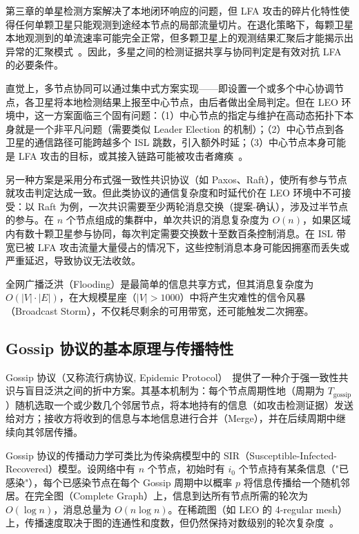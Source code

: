 第三章的单星检测方案解决了本地闭环响应的问题，但 LFA 攻击的碎片化特性使得任何单颗卫星只能观测到途经本节点的局部流量切片。在退化策略下，每颗卫星本地观测到的单流速率可能完全正常，但多颗卫星上的观测结果汇聚后才能揭示出异常的汇聚模式~\cite{crossfire, satshield}。因此，多星之间的检测证据共享与协同判定是有效对抗 LFA 的必要条件。

直觉上，多节点协同可以通过集中式方案实现——即设置一个或多个中心协调节点，各卫星将本地检测结果上报至中心节点，由后者做出全局判定。但在 LEO 环境中，这一方案面临三个固有问题：（1）中心节点的指定与维护在高动态拓扑下本身就是一个非平凡问题（需要类似 Leader Election 的机制）；（2）中心节点到各卫星的通信路径可能跨越多个 ISL 跳数，引入额外时延；（3）中心节点本身可能是 LFA 攻击的目标，或其接入链路可能被攻击者瘫痪~\cite{crossfire}。

另一种方案是采用分布式强一致性共识协议（如 Paxos、Raft），使所有参与节点就攻击判定达成一致。但此类协议的通信复杂度和时延代价在 LEO 环境中不可接受：以 Raft 为例，一次共识需要至少两轮消息交换（提案-确认），涉及过半节点的参与。在 $n$ 个节点组成的集群中，单次共识的消息复杂度为 $O(n)$，如果区域内有数十颗卫星参与协同，每次判定需要交换数十至数百条控制消息。在 ISL 带宽已被 LFA 攻击流量大量侵占的情况下，这些控制消息本身可能因拥塞而丢失或严重延迟，导致协议无法收敛。

全网广播泛洪（Flooding）是最简单的信息共享方式，但其消息复杂度为 $O(|V| \cdot |E|)$，在大规模星座（$|V| > 1000$）中将产生灾难性的信令风暴（Broadcast Storm），不仅耗尽剩余的可用带宽，还可能触发二次拥塞。

\subsection{Gossip 协议的基本原理与传播特性}

Gossip 协议（又称流行病协议, Epidemic Protocol）~\cite{demers1987epidemic}提供了一种介于强一致性共识与盲目泛洪之间的折中方案。其基本机制为：每个节点周期性地（周期为 $T_{\text{gossip}}$）随机选取一个或少数几个邻居节点，将本地持有的信息（如攻击检测证据）发送给对方；接收方将收到的信息与本地信息进行合并（Merge），并在后续周期中继续向其邻居传播。

Gossip 协议的传播动力学可类比为传染病模型中的 SIR（Susceptible-Infected-Recovered）模型。设网络中有 $n$ 个节点，初始时有 $i_0$ 个节点持有某条信息（"已感染"），每个已感染节点在每个 Gossip 周期中以概率 $p$ 将信息传播给一个随机邻居。在完全图（Complete Graph）上，信息到达所有节点所需的轮次为 $O(\log n)$，消息总量为 $O(n \log n)$。在稀疏图（如 LEO 的 4-regular mesh）上，传播速度取决于图的连通性和度数，但仍然保持对数级别的轮次复杂度~\cite{demers1987epidemic}。

